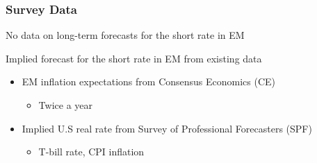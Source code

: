 \documentclass[12pt, aspectratio=169, xcolor=dvipsnames]{beamer}
\begin{document}
\begin{frame}[label=SCBP]
\frametitle{Survey Data}

No data on long-term forecasts for the short rate in EM

Implied forecast for the short rate in EM from existing data %
\begin{itemize}
\item \alert{EM inflation expectations} from Consensus Economics (CE)
\begin{itemize}
	\item Twice a year
\end{itemize}

\item Implied \alert{U.S real rate} from Survey of Professional Forecasters (SPF)
\begin{itemize}
\item T-bill rate, CPI inflation
\end{itemize}
\end{itemize}



\end{frame}
\end{document}
